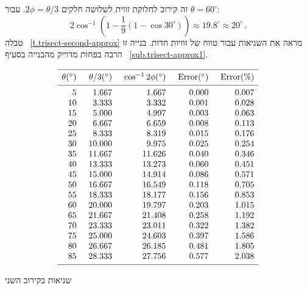 זה קירוב לחלוקת זווית לשלושה חלקים
$2\phi=\theta/3$.
עבור
$\theta=60^\circ$:
\[
2\cos^{-1}\left(1 - \frac{1}{9}(1-\cos 30^\circ)\right)\approx 19.8^\circ\approx 20^\circ\,.
\]
טבלה%
~\ref{t.trisect-second-approx}
מראה את השגיאות עבור טווח של זוויות חדות. בנייה זו הרבה בפחות מדוייק מהבנייה בסעיף%
~\ref{sub.trisect-approx1}.

\begin{table}[t]
\[
\begin{array}{r@{\hspace{5mm}}r@{\hspace{5mm}}r@{\hspace{5mm}}r@{\hspace{5mm}}r}
\hline
\noalign{\smallskip}
\theta ({}^\circ) & \theta/3 ({}^\circ)& \cos^{-1} 2\phi ({}^\circ) & \mathrm{Error} ({}^\circ) & \mathrm{Error (\%)}\\
\noalign{\smallskip}\hline\noalign{\smallskip}
  5 &    1.667 &    1.667  &     0.000 &    0.007 \\
 10 &    3.333 &    3.332  &     0.001 &    0.028 \\
 15 &    5.000 &    4.997  &     0.003 &    0.063 \\
 20 &    6.667 &    6.659  &     0.008 &    0.113 \\
 25 &    8.333 &    8.319  &     0.015 &    0.176 \\
 30 &   10.000 &    9.975  &     0.025 &    0.254 \\
 35 &   11.667 &   11.626  &     0.040 &    0.346 \\
 40 &   13.333 &   13.273  &     0.060 &    0.451 \\
 45 &   15.000 &   14.914  &     0.086 &    0.571 \\
 50 &   16.667 &   16.549  &     0.118 &    0.705 \\
 55 &   18.333 &   18.177  &     0.156 &    0.853 \\
 60 &   20.000 &   19.797  &     0.203 &    1.015 \\
 65 &   21.667 &   21.408  &     0.258 &    1.192 \\
 70 &   23.333 &   23.011  &     0.322 &    1.382 \\
 75 &   25.000 &   24.603  &     0.397 &    1.586 \\
 80 &   26.667 &   26.185  &     0.481 &    1.805 \\
 85 &   28.333 &   27.756  &     0.577 &    2.038 \\
 \noalign{\smallskip}
 \hline
 \end{array}
\]
\caption{שגיאות בקירוב השני}
\label{t.trisect-second-approx}
\end{table}

